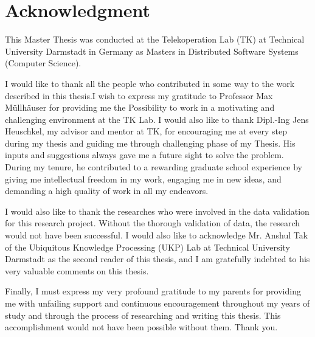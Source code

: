 \documentclass[12pt]{report}
\begin{document}
\begingroup
\fontsize{18pt}{18pt}\selectfont
\begin{center} 
\end{center}
\endgroup

\begingroup
\fontsize{13pt}{13pt}\selectfont
\begin{center} 

\end{center}
\endgroup

\newpage
\section*{Acknowledgment}
This Master Thesis was conducted at the Telekoperation Lab (TK) at Technical University Darmstadt in Germany as Masters in Distributed Software Systems (Computer Science).

I would like to thank all the people who contributed in some way to the work described in this thesis.I wish to express my gratitude to Professor Max Müllhäuser for providing me the Possibility to work in a motivating and challenging environment at the TK Lab. I would also like to thank Dipl.-Ing Jens Heuschkel, my advisor and mentor at TK, for encouraging me at every step during my thesis and guiding me through challenging phase of my Thesis. His inputs and suggestions always gave me a future sight to solve the problem. During my tenure, he contributed to a rewarding graduate school experience by giving me intellectual freedom in my work, engaging me in new ideas, and demanding a high quality of work in all my endeavors.

I would also like to thank the researches who were involved in the data validation for this research project. Without the thorough validation of data, the research would not have been successful. I would also like to acknowledge Mr. Anshul Tak of the Ubiquitous Knowledge Processing (UKP) Lab at Technical University Darmstadt as the second reader of this thesis, and I am gratefully indebted to his very valuable comments on this thesis.

Finally, I must express my very profound gratitude to my parents for providing me with unfailing support and continuous encouragement throughout my years of study and through the process of researching and writing this thesis. This accomplishment would not have been possible without them. Thank you.
\end{document}
